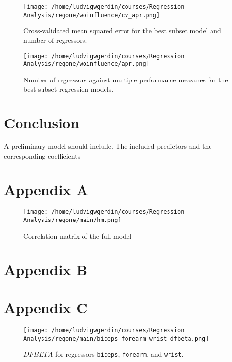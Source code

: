 \documentclass[11pt]{article}
\begin{document}




\begin{figure}[htbp]
\centering
\texttt{[image: /home/ludvigwgerdin/courses/Regression Analysis/regone/woinfluence/cv\_apr.png]}
\caption{\label{fig:org6ab726b}
Cross-validated mean squared error for the best subset model and number of regressors.}
\end{figure}

\begin{figure}[htbp]
\centering
\texttt{[image: /home/ludvigwgerdin/courses/Regression Analysis/regone/woinfluence/apr.png]}
\caption{\label{fig:org51c3ad0}
Number of regressors against multiple performance measures for the best subset regression models.}
\end{figure}

\newpage
\section{Conclusion}
\label{sec:orgcc88ad5}

A preliminary model should include. The included predictors and the corresponding coefficients 

\section{Appendix A}
\label{sec:orgdef5996}

\begin{figure}[H]
\centering
\texttt{[image: /home/ludvigwgerdin/courses/Regression Analysis/regone/main/hm.png]}
\caption{\label{fig:org3e51c99}
Correlation matrix of the full model}
\end{figure}

\newpage

\section{Appendix B}
\label{sec:org9a48ec0}
\section{Appendix C}
\label{sec:org661e022}

\begin{figure}[H]
\centering
\texttt{[image: /home/ludvigwgerdin/courses/Regression Analysis/regone/main/biceps\_forearm\_wrist\_dfbeta.png]}
\caption{\label{fig:org0ccc98b}
\(DFBETA\) for regressors \texttt{biceps}, \texttt{forearm}, and \texttt{wrist}.}
\end{figure}
\end{document}
